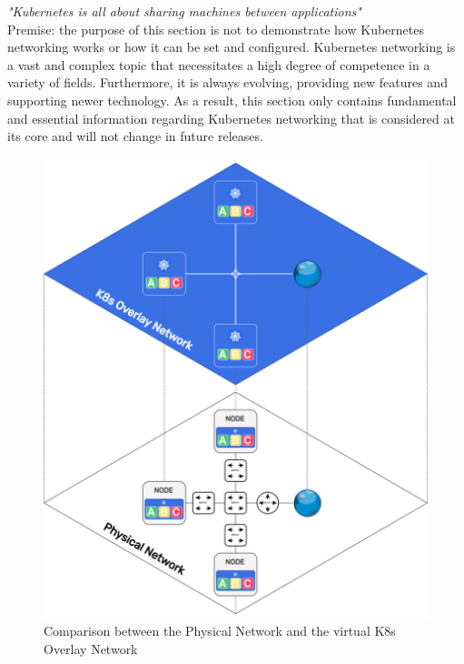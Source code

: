 \textit{"Kubernetes is all about sharing machines between applications"}\cite{k8s_cluster_networking}
\\ %

Premise: the purpose of this section is not to demonstrate how Kubernetes networking
works or how it can be set and configured. Kubernetes networking is a vast and
complex topic that necessitates a high degree of competence in a variety of
fields. Furthermore, it is always evolving, providing new features and supporting
newer technology. As a result, this section only contains fundamental and essential
information regarding Kubernetes networking that is considered at its core and will
not change in future releases.

\begin{figure}
  \centering
  \includegraphics[width=.5\textwidth]{images/recluster/overlay_network.png}
  \caption{Comparison
  between
  the
  Physical
  Network
  and
  the
  virtual
  K8s
  Overlay
  Network}
  \label{fig:overlay_network}
\end{figure}

